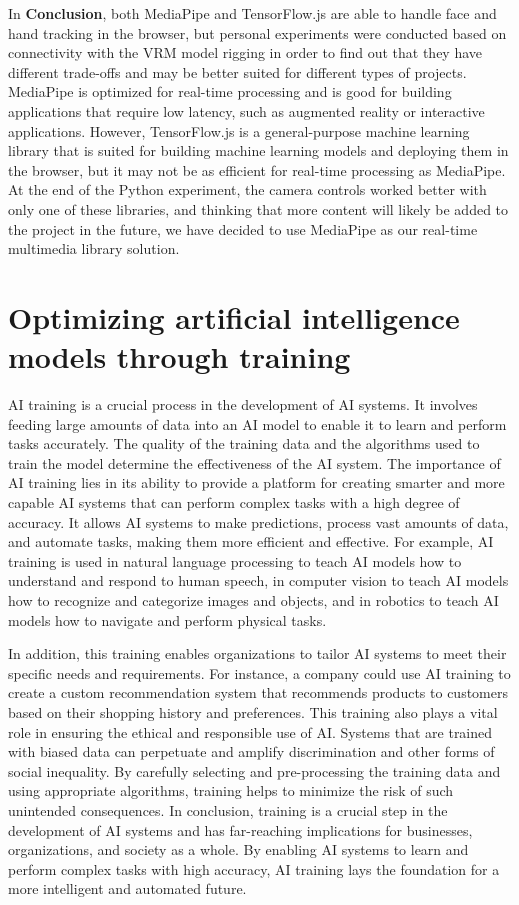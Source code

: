 In \textbf{Conclusion}, both MediaPipe and TensorFlow.js are able to handle face and hand
tracking in the browser, but personal experiments were conducted based on connectivity with the VRM model rigging in order to find out 
that they have different trade-offs and may be better suited
for different types of projects. MediaPipe is optimized for real-time processing and is
good for building applications that require low latency, such as augmented reality or
interactive applications. However, TensorFlow.js is a general-purpose machine learning
library that is suited for building machine learning models and deploying them in the
browser, but it may not be as efficient for real-time processing as MediaPipe. 
At the end of the Python experiment, the camera controls worked better with only one of these libraries, 
and thinking that more content will likely be added to the project in the future, we have decided 
to use MediaPipe as our real-time multimedia library solution.

\section{Optimizing artificial intelligence models through training}
AI training is a crucial process in the development of AI systems. 
It involves feeding large amounts of data into an AI model to enable it to learn and perform 
tasks accurately. The quality of the training data and the algorithms used to train the model 
determine the effectiveness of the AI system.
The importance of AI training lies in its ability to provide a platform for creating smarter 
and more capable AI systems that can perform complex tasks with a high degree of accuracy. 
It allows AI systems to make predictions, process vast amounts of data, and automate tasks, 
making them more efficient and effective.
For example, AI training is used in natural language processing to teach AI models how to 
understand and respond to human speech, in computer vision to teach AI models how to recognize 
and categorize images and objects, and in robotics to teach AI models how to navigate and perform 
physical tasks. \cite{training}

In addition, this training enables organizations to tailor AI systems to meet their 
specific needs and requirements. For instance, a company could use AI training to 
create a custom recommendation system that recommends products to customers based 
on their shopping history and preferences.
This training also plays a vital role in ensuring the ethical and responsible use of AI. 
Systems that are trained with biased data can perpetuate and amplify discrimination 
and other forms of social inequality. By carefully selecting and pre-processing the 
training data and using appropriate algorithms, training helps to minimize the risk 
of such unintended consequences.
In conclusion, training is a crucial step in the development of AI systems and has 
far-reaching implications for businesses, organizations, and society as a whole. 
By enabling AI systems to learn and perform complex tasks with high accuracy, 
AI training lays the foundation for a more intelligent and automated future.

